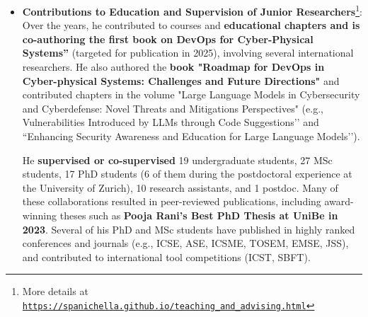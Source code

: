 \documentclass[11pt]{article}
\providecommand*\url[1]{\href{#1}{#1}}
\renewcommand*\url[1]{\href{#1}{\texttt{#1}}}
\begin{document}
\begin{itemize}
  \vspace{-2mm}
  \item 
  \textbf{Contributions to Education and Supervision of Junior Researchers}\footnote{More details at \url{https://spanichella.github.io/teaching\_and\_advising.html}}:  
Over the years, he contributed to courses and \textbf{educational chapters and is co-authoring the first book on DevOps for Cyber-Physical Systems''} (targeted for publication in 2025), involving several international researchers. He also authored the \textbf{book "Roadmap for DevOps in Cyber-physical Systems: Challenges and Future Directions"} and contributed chapters in the volume "Large Language Models in Cybersecurity and Cyberdefense: Novel Threats and Mitigations Perspectives" (e.g., Vulnerabilities Introduced by LLMs through Code Suggestions’’ and ``Enhancing Security Awareness and Education for Large Language Models’’). 

He \textbf{supervised or co-supervised} 19 undergraduate students, 27 MSc students, 17 PhD students (6 of them during the postdoctoral experience at the University of Zurich), 10 research assistants, and 1 postdoc. Many of these collaborations resulted in peer-reviewed publications, including award-winning theses such as \textbf{Pooja Rani’s Best PhD Thesis at UniBe in 2023}. Several of his PhD and MSc students have published in highly ranked conferences and journals (e.g., ICSE, ASE, ICSME, TOSEM, EMSE, JSS), and contributed to international tool competitions (ICST, SBFT). 


\end{itemize}
\end{document}
